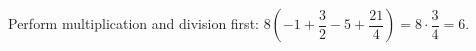 Perform multiplication and division first: $8(-1+\dfrac{3}{2}-5+\dfrac{21}{4})=8\cdot\dfrac{3}{4}=\boxed6$.
